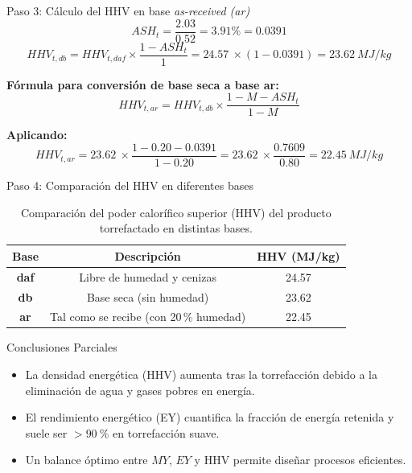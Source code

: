 \documentclass[main.tex]{subfiles}
\begin{document}
\begin{frame}{Paso 3: Cálculo del HHV en base \textit{as-received (ar)}}
\[
ASH_{t} = \frac{2.03}{0.52} = 3.91\% = 0.0391
\]
\[
HHV_{t,db} = HHV_{t,daf} \times \frac{1 - ASH_t}{1} = \SI{24.57}{} \times (1 - 0.0391) = \SI{23.62}{MJ/kg}
\]

\textbf{Fórmula para conversión de base seca a base ar:}
\[
HHV_{t,ar} = HHV_{t,db} \times \frac{1 - M - ASH_t}{1 - M}
\]

\textbf{Aplicando:}
\[
HHV_{t,ar} = \SI{23.62}{} \times \frac{1 - 0.20 - 0.0391}{1 - 0.20} = \SI{23.62}{} \times \frac{0.7609}{0.80} = \SI{22.45}{MJ/kg}
\]
\end{frame}

\begin{frame}{Paso 4: Comparación del HHV en diferentes bases}
\small
\begin{table}[h!]
\centering
\begin{tabular}{|c|c|c|}
\hline
\textbf{Base} & \textbf{Descripción} & \textbf{HHV (MJ/kg)} \\
\hline
\textbf{daf} & Libre de humedad y cenizas & \SI{24.57}{} \\
\textbf{db} & Base seca (sin humedad) & \SI{23.62}{} \\
\textbf{ar} & Tal como se recibe (con 20 \% humedad) & \SI{22.45}{} \\
\hline
\end{tabular}
\caption*{\footnotesize Comparación del poder calorífico superior (HHV) del producto torrefactado en distintas bases.}
\end{table}
\end{frame}


\begin{frame}{Conclusiones Parciales}
\begin{itemize}
  \item La densidad energética (HHV) aumenta tras la torrefacción debido a la eliminación de agua y gases pobres en energía.
  \item El rendimiento energético (EY) cuantifica la fracción de energía retenida y suele ser $> \SI{90}{\percent}$ en torrefacción suave.
  \item Un balance óptimo entre $MY$, $EY$ y HHV permite diseñar procesos eficientes.
\end{itemize}
\end{frame}
\end{document}
